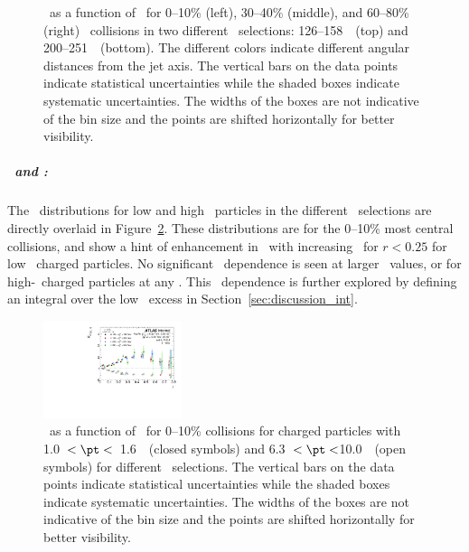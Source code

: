 \begin{figure}[h]
{\begin{tabular}{ccc}
\end{tabular}}
\caption{\RDptr\ as a function of \pt\ for  0--10\% (left), 30--40\% (middle), and 60--80\% (right) \PbPb\ collisions in two different \ptjet\ selections: 126--158~\GeV\ (top) and 200--251~\GeV\ (bottom).
The different colors indicate different angular distances from the jet axis.
The vertical bars on the data points indicate statistical uncertainties while the shaded boxes indicate systematic uncertainties.
The widths of the boxes are not indicative of the bin size and the points are shifted horizontally for better visibility.}
\label{fig:pttrkdep}
\end{figure}


\subparagraph{\RDptr\ and \ptjet:}

The \RDptr\ distributions for low and high \pt\ particles in the different \ptjet\ selections are directly overlaid in Figure~\ref{fig:ptjetdep}.
These distributions are for the 0--10\% most central collisions, and show a hint of enhancement in \RDptr\ with increasing \ptjet\  for $r < 0.25$ for low  \pt\ charged particles.
No significant \ptjet\ dependence is seen at larger \rvar\ values, or for high-\pt\ charged particles at any \rvar.
This \ptjet\ dependence is further explored by defining an integral over the low \pt\ excess in Section~\ref{sec:discussion_int}.

\begin{figure}[ht]
\centerline{
\includegraphics[width=0.36\textwidth]{figures/results/RDpT_dR_trk3_trk6_cent0}}
\caption{\RDptr\ as a function of \rvar\ for 0--10\% collisions for charged particles with 1.0~$< \pt <$~1.6~\GeV\ (closed symbols) and 6.3~$< \pt <$10.0~\GeV\ (open symbols) for different \ptjet\ selections.
The vertical bars on the data points indicate statistical uncertainties while the shaded boxes indicate systematic uncertainties.
The widths of the boxes are not indicative of the bin size and the points are shifted horizontally for better visibility.}
\label{fig:ptjetdep}
\end{figure}




